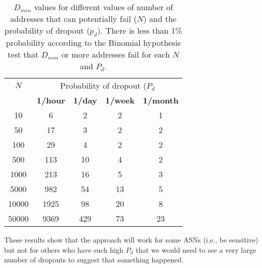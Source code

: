 \begin{table}[th]
  \centering
  \hspace{-0.04in}
  \begin{tabular}{c|c|c|c|c|}
$N$ & \multicolumn{4}{c|}{Probability of dropout ($P_d$} \\
    & \textbf{1/hour} & \textbf{1/day} & \textbf{1/week} &
    \textbf{1/month} \\
    \hline
10 & 6 & 2 & 2 & 1\\
50 & 17 & 3 & 2 & 2\\
100 & 29 & 4 & 2 & 2\\
500 & 113 & 10 & 4 & 2\\
1000 & 213 & 16 & 5 & 3\\
5000 & 982 & 54 & 13 & 5\\
10000 & 1925 & 98 & 20 & 8\\
50000 & 9369 & 429 & 73 & 23\\
    \end{tabular}
  \caption{\label{tbl:binomial_thresh} $D_{min}$ values
    for different
    values of number of addresses that can potentially fail ($N$) and
    the probability of dropout ($p_d$). There is less than 1\%
    probability according to the Binomial hypothesis test that
    $D_{min}$ or more addresses fail for each $N$ and $P_d$.
  }
\end{table}

These results show that the approach will work for some ASNs (i.e., be
sensitive) but not for others who have such high $P_d$ that we would need to see a very large number of dropouts to suggest that something happened.











